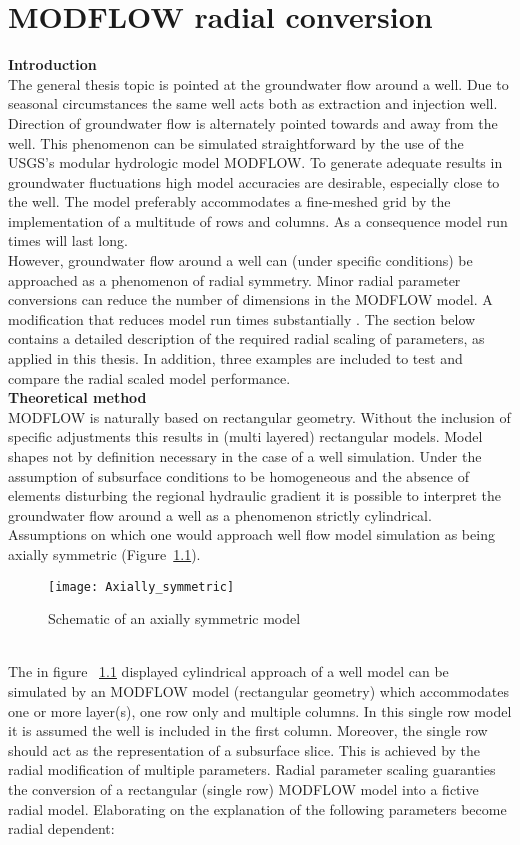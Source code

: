 \chapter{MODFLOW radial conversion}
\label{MODFLOW_radial}

\textbf{Introduction} \\
The general thesis topic is pointed at the groundwater flow around a well. Due to seasonal circumstances the same well acts both as extraction and injection well. Direction of groundwater flow is alternately pointed towards and away from the well. This phenomenon can be simulated straightforward by the use of the USGS's modular hydrologic model MODFLOW. To generate adequate results in groundwater fluctuations high model accuracies are desirable, especially close to the well. The model preferably accommodates a fine-meshed grid by the implementation of a multitude of rows and columns. As a consequence model run times will last long. \\ However, groundwater flow around a well can (under specific conditions) be approached as a phenomenon of radial symmetry. Minor radial parameter conversions can reduce the number of dimensions in the MODFLOW model. A modification that reduces model run times substantially \citep{Langevin2008}. The section below contains a detailed description of the required radial scaling of parameters, as applied in this thesis. In addition, three examples are included to test and compare the radial scaled model performance.  
\bigskip \\
\textbf{Theoretical method} \\
MODFLOW is naturally based on rectangular geometry. Without the inclusion of specific adjustments this results in (multi layered) rectangular models. Model shapes not by definition necessary in the case of a well simulation. Under the assumption of subsurface conditions to be homogeneous and the absence of elements disturbing the regional hydraulic gradient it is possible to interpret the groundwater flow around a well as a phenomenon strictly cylindrical. Assumptions on which one would approach well flow model simulation as being axially symmetric (Figure~\ref{fig:Axially}).
\begin{figure}[h!]
 \centering\texttt{[image: Axially\_symmetric]}
 \captionsetup{justification=centering}
 \caption{Schematic of an axially symmetric model \citep{Langevin2008}}
 \label{fig:Axially}
\end{figure} 
\bigskip \\
The in figure ~\ref{fig:Axially} displayed cylindrical approach of a well model can be simulated by an MODFLOW model (rectangular geometry) which accommodates one or more layer(s), one row only and multiple columns. In this single row model it is assumed the well is included in the first column. Moreover, the single row should act as the representation of a subsurface slice. This is achieved by the radial modification of multiple parameters. Radial parameter scaling guaranties the conversion of a rectangular (single row) MODFLOW model into a fictive radial model. Elaborating on the explanation of \citet{Langevin2008} the following parameters become radial dependent:    
  
